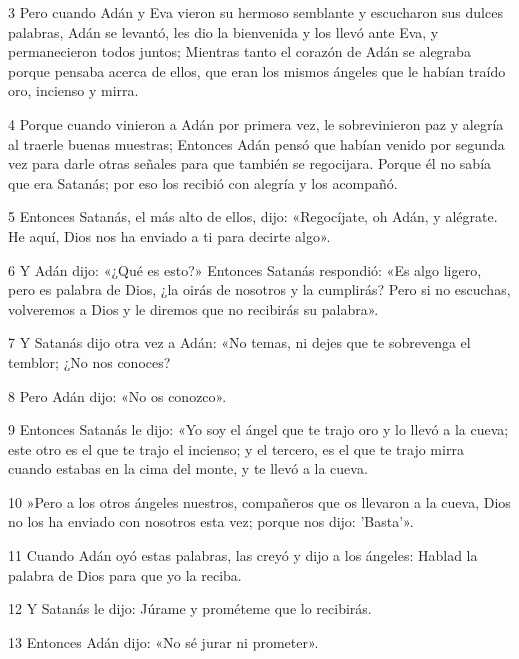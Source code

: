 \par 3 Pero cuando Adán y Eva vieron su hermoso semblante y escucharon sus dulces palabras, Adán se levantó, les dio la bienvenida y los llevó ante Eva, y permanecieron todos juntos; Mientras tanto el corazón de Adán se alegraba porque pensaba acerca de ellos, que eran los mismos ángeles que le habían traído oro, incienso y mirra.

\par 4 Porque cuando vinieron a Adán por primera vez, le sobrevinieron paz y alegría al traerle buenas muestras; Entonces Adán pensó que habían venido por segunda vez para darle otras señales para que también se regocijara. Porque él no sabía que era Satanás; por eso los recibió con alegría y los acompañó.

\par 5 Entonces Satanás, el más alto de ellos, dijo: «Regocíjate, oh Adán, y alégrate. He aquí, Dios nos ha enviado a ti para decirte algo».

\par 6 Y Adán dijo: «¿Qué es esto?» Entonces Satanás respondió: «Es algo ligero, pero es palabra de Dios, ¿la oirás de nosotros y la cumplirás? Pero si no escuchas, volveremos a Dios y le diremos que no recibirás su palabra».

\par 7 Y Satanás dijo otra vez a Adán: «No temas, ni dejes que te sobrevenga el temblor; ¿No nos conoces?

\par 8 Pero Adán dijo: «No os conozco».

\par 9 Entonces Satanás le dijo: «Yo soy el ángel que te trajo oro y lo llevó a la cueva; este otro es el que te trajo el incienso; y el tercero, es el que te trajo mirra cuando estabas en la cima del monte, y te llevó a la cueva.

\par 10 »Pero a los otros ángeles nuestros, compañeros que os llevaron a la cueva, Dios no los ha enviado con nosotros esta vez; porque nos dijo: 'Basta'».

\par 11 Cuando Adán oyó estas palabras, las creyó y dijo a los ángeles: Hablad la palabra de Dios para que yo la reciba.

\par 12 Y Satanás le dijo: Júrame y prométeme que lo recibirás.

\par 13 Entonces Adán dijo: «No sé jurar ni prometer».

